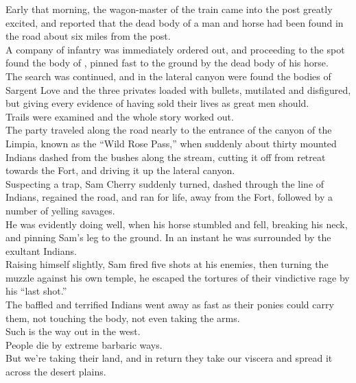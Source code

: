 

Early that morning, the wagon-master of the train came into the post greatly excited, and reported that the dead body of a man and horse had been found in the road about six miles from the post. \\

A company of infantry was immediately ordered out, and proceeding to the spot found the body of , pinned fast to the ground by the dead body of his horse. \\

The search was continued, and in the lateral canyon were found the bodies of Sargent Love and the three privates loaded with bullets, mutilated and disfigured, but giving every evidence of having sold their lives as great men should. \\

Trails were examined and the whole story worked out. \\

The party traveled along the road nearly to the entrance of the canyon of the Limpia, known as the ``Wild Rose Pass,'' when suddenly about thirty mounted Indians dashed from the bushes along the stream, cutting it off from retreat towards the Fort, and driving it up the lateral canyon. \\

Suspecting a trap, Sam Cherry suddenly turned, dashed through the line of Indians, regained the road, and ran for life, away from the Fort, followed by a number of yelling savages. \\
He was evidently doing well, when his horse stumbled and fell, breaking his neck, and pinning Sam's leg to the ground. In an instant he was surrounded by the exultant Indians. \\

Raising himself slightly, Sam fired five shots at his enemies, then turning the muzzle against his own temple, he escaped the tortures of their vindictive rage by his ``last shot.'' \\
The baffled and terrified Indians went away as fast as their ponies could carry them, not touching the body, not even taking the arms. \\

Such is the way out in the west. \\
People die by extreme barbaric ways. \\
But we're taking their land, and in return they take our viscera and spread it across the desert plains. \\

